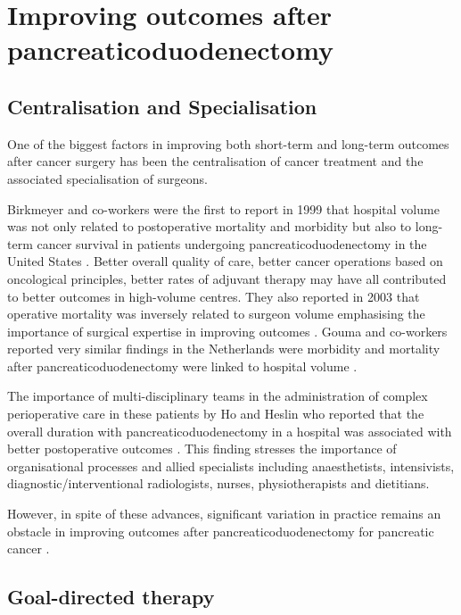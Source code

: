 \section{Improving outcomes after pancreaticoduodenectomy}

\subsection{Centralisation and Specialisation}

One of the biggest factors in improving both short-term and long-term outcomes after cancer surgery has been the centralisation of cancer treatment and the associated specialisation of surgeons. 

Birkmeyer and co-workers were the first to report in 1999 that hospital volume was not only related to postoperative mortality and morbidity but also to long-term cancer survival in patients undergoing pancreaticoduodenectomy in the United States \parencite{birkmeyer_relationship_1999}.
Better overall quality of care, better cancer operations based on oncological principles, better rates of adjuvant therapy may have all contributed to better outcomes in high-volume centres. 
They also reported in 2003 that operative mortality was inversely related to surgeon volume emphasising the importance of surgical expertise in improving outcomes \parencite{birkmeyer_surgeon_2003}.
Gouma and co-workers reported very similar findings in the Netherlands were morbidity and mortality after pancreaticoduodenectomy were linked to hospital volume \parencite{gouma_rates_2000}.

The importance of multi-disciplinary teams in the administration of complex perioperative care in these patients by Ho and Heslin who reported that the overall duration with pancreaticoduodenectomy in a hospital was associated with better postoperative outcomes \parencite{ho_effect_2003}.
This finding stresses the importance of organisational processes and allied specialists including anaesthetists, intensivists, diagnostic/interventional radiologists, nurses, physiotherapists and dietitians.

However, in spite of these advances, significant variation in practice remains an obstacle in improving outcomes after pancreaticoduodenectomy for pancreatic cancer \parencite{cyr_canadian_2015}.

\subsection{Goal-directed therapy}

